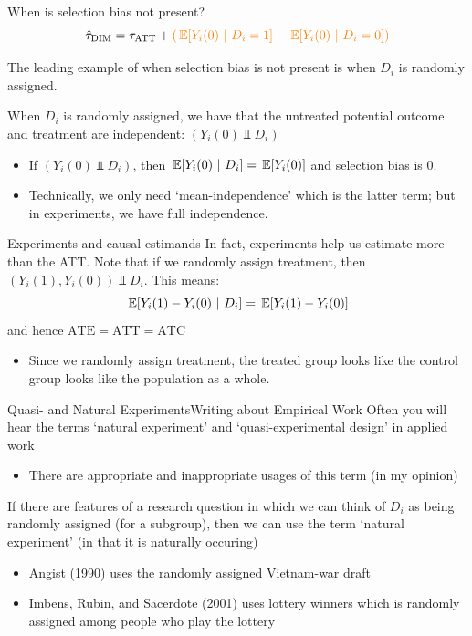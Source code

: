 \documentclass[aspectratio=169,t,11pt,table]{beamer}
\begin{document}
\begin{frame}{When is selection bias not present?}
  \vspace*{-\bigskipamount}
  $$
    \hat{\tau}_{\text{DIM}} = \tau_{\text{ATT}} + {\color{orange} \left( \expec{Y_{i}(0)}{D_i = 1} - \expec{Y_{i}(0)}{D_i = 0} \right) }
  $$

  \bigskip
  The leading example of when selection bias is not present is when $D_i$ is randomly assigned.
  
  \pause
  \bigskip
  When $D_i$ is randomly assigned, we have that the untreated potential outcome and treatment are independent: $(Y_i(0) \Perp D_i)$
  \begin{itemize}
    \item If $(Y_i(0) \Perp D_i)$, then $\expec{Y_{i}(0)}{D_i} = \expec{Y_{i}(0)}$ and selection bias is 0.

    \pause 
    \item Technically, we only need `mean-independence' which is the latter term; but in experiments, we have full independence.
  \end{itemize}
\end{frame}

\begin{frame}{Experiments and causal estimands}
  In fact, experiments help us estimate more than the ATT. Note that if we randomly assign treatment, then $(Y_i(1), Y_i(0)) \Perp D_i$. This means: 
  $$
    \expec{Y_i(1) - Y_i(0)}{D_i} = \expec{Y_i(1) - Y_i(0)}
  $$
  and hence $\text{ATE} = \text{ATT} = \text{ATC}$

  \begin{itemize}
    \item Since we randomly assign treatment, the treated group looks like the control group looks like the population as a whole.
  \end{itemize}

\end{frame}

\begin{frame}{Quasi- and Natural Experiments}{Writing about Empirical Work}
  Often you will hear the terms `natural experiment' and `quasi-experimental design' in applied work
  \begin{itemize}
    \item There are appropriate and inappropriate usages of this term (in my opinion)
  \end{itemize}

  \bigskip
  If there are features of a research question in which we can think of $D_i$ as being randomly assigned (for a subgroup), then we can use the term `natural experiment' (in that it is naturally occuring)
  \begin{itemize}
    \item Angist (1990) uses the randomly assigned Vietnam-war draft
    \item Imbens, Rubin, and Sacerdote (2001) uses lottery winners which is randomly assigned among people who play the lottery
  \end{itemize}
\end{frame}
\end{document}

